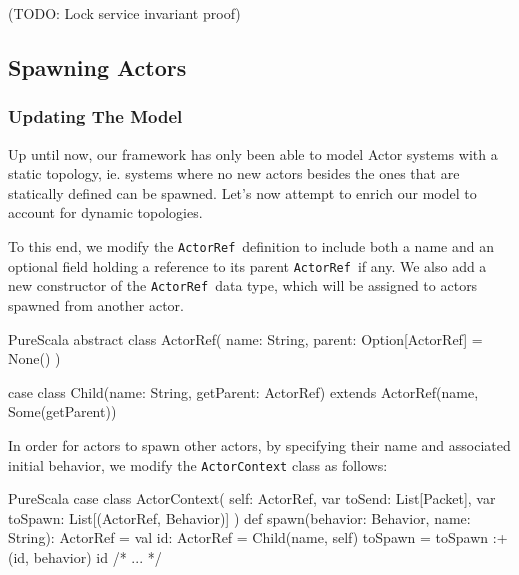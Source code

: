 \documentclass[a4paper,twoside]{article}
\newcommand{\InlineS}[1]{\lstinline[language=PureScala,basicstyle=\small\ttfamily,columns=fixed]|#1|}
\newcommand{\TODO}[1]{\textcolor{YellowOrange}{(TODO: #1)}} %
\newcommand{\ActorRef}{\InlineS{ActorRef}\ }
\newcommand{\stt}[1]{\texttt{\small{#1}}}
\begin{document}
\TODO{Lock service invariant proof}

%

%

\subsection{Spawning Actors}
\label{spawn}

\subsubsection{Updating The Model}

Up until now, our framework has only been able to model Actor systems with a static topology, ie. systems where no new actors besides the ones that are statically defined can be spawned. Let's now attempt to enrich our model to account for dynamic topologies.

To this end, we modify the \ActorRef definition to include both a name and an optional field holding a reference to its parent \ActorRef if any. We also add a new constructor of the \ActorRef data type, which will be assigned to actors spawned from another actor.

\begin{ShortCode}{PureScala}
abstract class ActorRef(
  name: String,
  parent: Option[ActorRef] = None()
)

case class Child(name: String, getParent: ActorRef)
  extends ActorRef(name, Some(getParent))
\end{ShortCode}

In order for actors to spawn other actors, by specifying their name and associated 
initial behavior, we modify the \stt{ActorContext} class as follows:

\begin{ShortCode}{PureScala}
case class ActorContext(
  self: ActorRef,
  var toSend: List[Packet],
  var toSpawn: List[(ActorRef, Behavior)]
) {
  def spawn(behavior: Behavior, name: String): ActorRef = {
    val id: ActorRef = Child(name, self)
    toSpawn = toSpawn :+ (id, behavior)
    id
  }
  /* ... */
}
\end{ShortCode}
\end{document}
